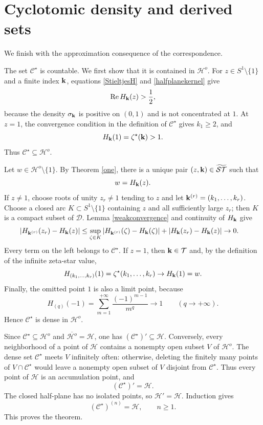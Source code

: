 \documentclass[12pt,a4paper]{amsart}
\makeatletter
\numberwithin{equation}{section}
\renewenvironment{proof}[1][Proof]{%
  \par\pushQED{\qed}%
  \normalfont\topsep6\p@\@plus6\p@\relax
  \trivlist
  \item[\hskip\labelsep\bfseries #1:]\ignorespaces
}{%
  \popQED\endtrivlist\@endpefalse
}
\theoremstyle{plain}
\theoremstyle{definition}
\makeatother
\begin{document}
\section{Cyclotomic density and derived sets}\label{sec:cyclotomic}
We finish with the approximation consequence of the correspondence.

\begin{proof}[Proof of Theorem \ref{cyc}]
The set $\mathcal{C}^{\star}$ is countable.  We first show that it is contained in $\mathcal{H}^{o}$.  For $z\in S^1\setminus\{1\}$ and a finite index ${\bf k}$, equations \eqref{StieltjesH} and \eqref{halfplanekernel} give
\[
\mathrm{Re}\,H_{\bf k}(z)>\frac12,
\]
because the density $\sigma_{\bf k}$ is positive on $(0,1)$ and is not concentrated at $1$.  At $z=1$, the convergence condition in the definition of $\mathcal{C}^{\star}$ gives $k_1\geq2$, and
\[
H_{\bf k}(1)=\zeta^{\star}({\bf k})>1.
\]
Thus $\mathcal{C}^{\star}\subseteq\mathcal{H}^{o}$.

Let $w\in\mathcal{H}^{o}\setminus\{1\}$.  By Theorem \ref{one}, there is a unique pair $(z,{\bf k})\in\widetilde{\mathcal{ST}}$ such that
\[
w=H_{\bf k}(z).
\]
If $z\neq1$, choose roots of unity $z_r\neq1$ tending to $z$ and let
${\bf k}^{(r)}=(k_1,\ldots,k_r)$.  Choose a closed arc $K\subset S^1\setminus\{1\}$ containing $z$ and all sufficiently large $z_r$; then $K$ is a compact subset of $\mathcal{D}$.  Lemma \ref{weakconvergence} and continuity of $H_{\bf k}$ give
\[
\begin{split}
|H_{{\bf k}^{(r)}}(z_r)-H_{\bf k}(z)|
&\leq\sup_{\zeta\in K}|H_{{\bf k}^{(r)}}(\zeta)-H_{\bf k}(\zeta)|
  +|H_{\bf k}(z_r)-H_{\bf k}(z)|\rightarrow0.
\end{split}
\]
Every term on the left belongs to $\mathcal{C}^{\star}$.  If $z=1$, then ${\bf k}\in\mathcal{T}$ and, by the definition of the infinite zeta-star value,
\[
H_{(k_1,\ldots,k_r)}(1)
=\zeta^{\star}(k_1,\ldots,k_r)
\rightarrow H_{\bf k}(1)=w.
\]
Finally, the omitted point $1$ is also a limit point, because
\[
H_{(q)}(-1)=\sum_{m=1}^{+\infty}\frac{(-1)^{m-1}}{m^q}
\rightarrow1
\qquad(q\rightarrow+\infty).
\]
Hence $\mathcal{C}^{\star}$ is dense in $\mathcal{H}^{o}$.

Since $\mathcal{C}^{\star}\subseteq\mathcal{H}^{o}$ and
$\overline{\mathcal{H}^{o}}=\mathcal{H}$, one has
$(\mathcal{C}^{\star})'\subseteq\mathcal{H}$.  Conversely, every neighborhood of a point of $\mathcal{H}$ contains a nonempty open subset $V$ of $\mathcal{H}^{o}$.  The dense set $\mathcal{C}^{\star}$ meets $V$ infinitely often: otherwise, deleting the finitely many points of $V\cap\mathcal{C}^{\star}$ would leave a nonempty open subset of $V$ disjoint from $\mathcal{C}^{\star}$.  Thus every point of $\mathcal{H}$ is an accumulation point, and
\[
(\mathcal{C}^{\star})'=\mathcal{H}.
\]
The closed half-plane has no isolated points, so $\mathcal{H}'=\mathcal{H}$.  Induction gives
\[
(\mathcal{C}^{\star})^{(n)}=\mathcal{H},
\qquad n\geq1.
\]
This proves the theorem.
\end{proof}
\end{document}
